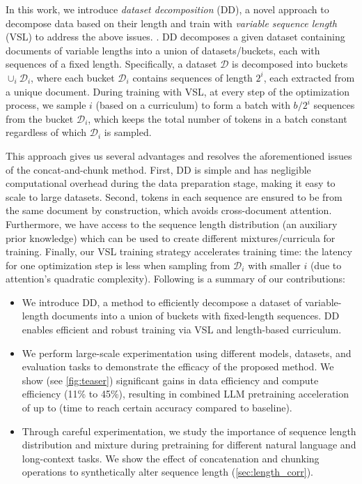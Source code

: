 In this work, we introduce \emph{dataset decomposition} (DD), a novel approach to decompose data based on their length and train with \emph{variable sequence length} (VSL)  to address the above issues. . DD decomposes a given dataset containing documents of variable lengths into a union of datasets/buckets, each with sequences of a fixed length. Specifically, a dataset $\mathcal{D}$ is decomposed into buckets $\cup_i \mathcal{D}_i$, where each bucket $\mathcal{D}_i$ contains sequences of length $2^i$, each extracted from a unique document. During training with VSL, at every step of the optimization process, we sample $i$ (based on a curriculum) to form a batch with $b/2^i$ sequences from the bucket $\mathcal{D}_i$, which keeps the total number of tokens in a batch constant  regardless of which $\mathcal{D}_i$ is sampled.

This approach gives us several advantages and resolves the aforementioned issues of the concat-and-chunk method. First, DD is simple and has negligible computational overhead during the data preparation stage, making it easy to scale to large datasets. Second, tokens in each sequence are ensured to be from the same document by construction, which avoids cross-document attention. Furthermore, we have access to the sequence length distribution (an auxiliary prior knowledge) which can be used to create different mixtures/curricula for training. Finally, our VSL training strategy accelerates training time: the latency for one optimization step is less when sampling from $\mathcal{D}_i$ with smaller $i$ (due to attention's quadratic complexity).
Following is a summary of our contributions:
\begin{itemize}[leftmargin=*]
   \item We introduce DD, a method to efficiently decompose a dataset of variable-length documents into a union of buckets with fixed-length sequences. DD enables efficient and robust training via VSL and length-based curriculum.
   \item We perform large-scale experimentation using different models, datasets, and evaluation tasks to demonstrate the efficacy of the proposed method. We show (see \cref{fig:teaser}) significant gains in data efficiency \revisionred{($> 4\times$)} and compute efficiency (11\% to 45\%), resulting in combined LLM pretraining acceleration of up to \revisionred{$6\times$} (time to reach certain accuracy compared to baseline).
   \item Through careful experimentation, we study the importance of sequence length distribution and mixture during pretraining for different natural language and long-context tasks. We show the effect of concatenation and chunking operations to synthetically alter sequence length (\cref{sec:length_corr}).
\end{itemize}


